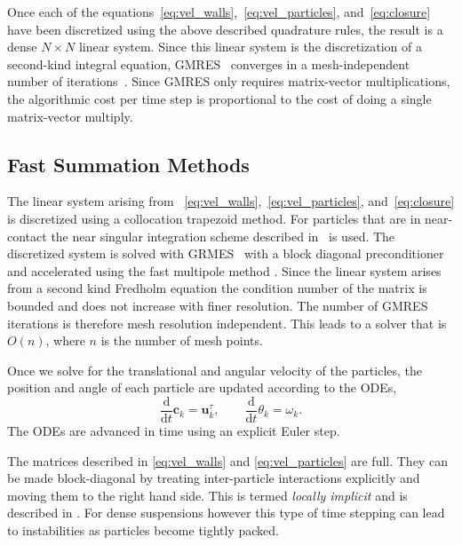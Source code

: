 \documentclass[preprint, 10pt]{elsarticle}
\begin{document}
Once each of the
equations~\eqref{eq:vel_walls},~\eqref{eq:vel_particles},
and~\eqref{eq:closure} have been discretized using the above described
quadrature rules, the result is a dense $N \times N$ linear system.
Since this linear system is the discretization of a second-kind integral
equation, GMRES~\cite{Saad1986} converges in a mesh-independent number of
iterations~\cite{cam-ips-kel-mey-xue1996}.  Since GMRES only requires
matrix-vector multiplications, the algorithmic cost per time step is
proportional to the cost of doing a single matrix-vector multiply.




\subsection{Fast Summation Methods}




The linear system arising from ~\eqref{eq:vel_walls},~\eqref{eq:vel_particles},
and~\eqref{eq:closure}  is discretized using a collocation trapezoid
method. For particles that are in near-contact the near singular
integration scheme described in~\cite{Quaife2014, Ying2006} is used. The
discretized system is solved with GRMES~\cite{Saad1986} with a block
diagonal preconditioner and accelerated using the fast multipole method
\cite{Greengard1987}.  Since the linear system arises from a second kind
Fredholm equation the condition number of the matrix is bounded and does
not increase with finer resolution. The number of GMRES iterations is
therefore mesh resolution independent. This leads to a solver that is
$O(n)$, where $n$ is the number of mesh points. 

Once we solve for the translational and angular velocity of the
particles, the position and angle of each particle are updated according
to the ODEs,
\[ \frac{\text{d}}{\text{d}t}\mathbf{c}_k = \mathbf{u}^\tau_k, \qquad
\frac{\text{d}}{\text{d}t}\theta_k =\omega_k.\]
The ODEs are advanced in time using an explicit Euler step. 

The matrices described in \eqref{eq:vel_walls} and
\eqref{eq:vel_particles} are full. They can be made block-diagonal by
treating inter-particle interactions explicitly and moving them to the
right hand side. This is termed {\em locally implicit} and is described
in \cite{Lu2017}. For dense suspensions however this type of time
stepping can lead to instabilities as particles become tightly packed. 
\end{document}
